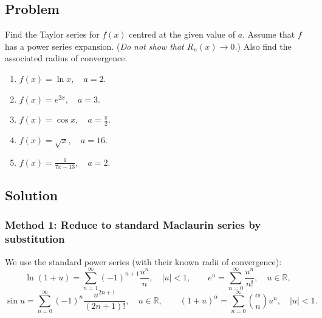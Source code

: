 \documentclass[12pt]{article}
\newcommand{\R}{\mathbb{R}}
\begin{document}
\subsection*{Problem}
Find the Taylor series for \(f(x)\) centred at the given value of \(a\).
Assume that \(f\) has a power series expansion. (\emph{Do not show that \(R_n(x)\to 0\).})
Also find the associated radius of convergence.
\begin{enumerate}[label=(\alph*)]
  \item \(f(x)=\ln x,\quad a=2.\)
  \item \(f(x)=e^{2x},\quad a=3.\)
  \item \(f(x)=\cos x,\quad a=\frac{\pi}{2}.\)
  \item \(f(x)=\sqrt{x},\quad a=16.\)
  \item \(f(x)=\frac{1}{7x-13},\quad a=2.\)
\end{enumerate}

\subsection*{Solution}

\subsubsection*{Method 1: Reduce to standard Maclaurin series by substitution}
We use the standard power series (with their known radii of convergence):
\[
\ln(1+u)=\sum_{n=1}^\infty (-1)^{n+1}\frac{u^n}{n},\quad |u|<1,
\qquad
e^{u}=\sum_{n=0}^\infty \frac{u^n}{n!},\quad u\in\R,
\]
\[
\sin u=\sum_{n=0}^\infty (-1)^n\frac{u^{2n+1}}{(2n+1)!},\quad u\in\R,
\qquad
(1+u)^\alpha=\sum_{n=0}^\infty \binom{\alpha}{n}u^n,\quad |u|<1.
\]
\end{document}
